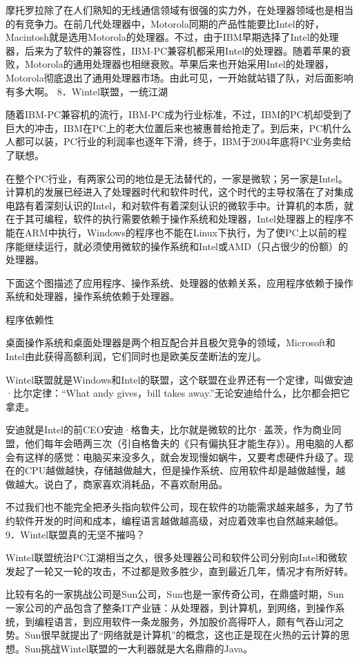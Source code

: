 \documentclass[12pt,UTF8]{ctexbook}
\begin{document}
摩托罗拉除了在人们熟知的无线通信领域有很强的实力外，在处理器领域也是相当的有竞争力。在前几代处理器中，Motorola同期的产品性能要比Intel的好，Macintosh就是选用Motorola的处理器。不过，由于IBM早期选择了Intel的处理器，后来为了软件的兼容性，IBM-PC兼容机都采用Intel的处理器。随着苹果的衰败，Motorola的通用处理器也相继衰败。苹果后来也开始采用Intel的处理器，Motorola彻底退出了通用处理器市场。由此可见，一开始就站错了队，对后面影响有多大啊。
8．Wintel联盟，一统江湖

随着IBM-PC兼容机的流行，IBM-PC成为行业标准，不过，IBM的PC机却受到了巨大的冲击，IBM在PC上的老大位置后来也被惠普给抢走了。到后来，PC机什么人都可以装，PC行业的利润率也逐年下滑，终于，IBM于2004年底将PC业务卖给了联想。

在整个PC行业，有两家公司的地位是无法替代的，一家是微软；另一家是Intel。计算机的发展已经进入了处理器时代和软件时代，这个时代的主导权落在了对集成电路有着深刻认识的Intel，和对软件有着深刻认识的微软手中。计算机的本质，就在于其可编程，软件的执行需要依赖于操作系统和处理器，Intel处理器上的程序不能在ARM中执行，Windows的程序也不能在Linux下执行，为了使PC上以前的程序能继续运行，就必须使用微软的操作系统和Intel或AMD（只占很少的份额）的处理器。

下面这个图描述了应用程序、操作系统、处理器的依赖关系，应用程序依赖于操作系统和处理器，操作系统依赖于处理器。

程序依赖性

桌面操作系统和桌面处理器是两个相互配合并且极欠竞争的领域，Microsoft和Intel由此获得高额利润，它们同时也是欧美反垄断法的宠儿。

Wintel联盟就是Windows和Intel的联盟，这个联盟在业界还有一个定律，叫做安迪·比尔定律：“What andy gives，bill takes away.”无论安迪给什么，比尔都会把它拿走。

安迪就是Intel的前CEO安迪·格鲁夫，比尔就是微软的比尔·盖茨，作为商业同盟，他们每年会晤两三次（引自格鲁夫的《只有偏执狂才能生存》）。用电脑的人都会有这样的感觉：电脑买来没多久，就会发现慢如蜗牛，又要考虑硬件升级了。现在的CPU越做越快，存储越做越大，但是操作系统、应用软件却是越做越慢，越做越大。说白了，商家喜欢消耗品，不喜欢耐用品。

不过我们也不能完全把矛头指向软件公司，现在软件的功能需求越来越多，为了节约软件开发的时间和成本，编程语言越做越高级，对应着效率也自然越来越低。
9．Wintel联盟真的无坚不摧吗？

Wintel联盟统治PC江湖相当之久，很多处理器公司和软件公司分别向Intel和微软发起了一轮又一轮的攻击，不过都是败多胜少，直到最近几年，情况才有所好转。

比较有名的一家挑战公司是Sun公司，Sun也是一家传奇公司，在鼎盛时期，Sun一家公司的产品包含了整条IT产业链：从处理器，到计算机，到网络，到操作系统，到编程语言，到应用软件一条龙服务，外加股价高得吓人，颇有气吞山河之势。Sun很早就提出了“网络就是计算机”的概念，这也正是现在火热的云计算的思想。Sun挑战Wintel联盟的一大利器就是大名鼎鼎的Java。
\end{document}
